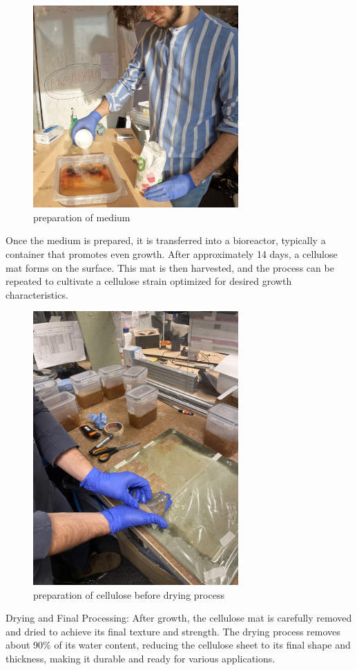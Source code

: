 \begin{figure}[h]
    \centering
    \includegraphics[width=0.7\textwidth]{images/preparation.png}
    \caption{preparation of medium}
    \label{fig:manufactureperso2}
\end{figure} 
Once the medium is prepared, it is transferred into a bioreactor, typically a container that promotes even growth. After approximately 14 days, a cellulose mat forms on the surface. This mat is then harvested, and the process can be repeated to cultivate a cellulose strain optimized for desired growth characteristics.

\begin{figure}[h]
    \centering
    \includegraphics[width=0.7\textwidth]{images/IMG_4565.jpg}
    \caption{preparation of cellulose before drying process}
    \label{fig:manufactureperso3c}
\end{figure} 
Drying and Final Processing: After growth, the cellulose mat is carefully removed and dried to achieve its final texture and strength. The drying process removes about 90\% of its water content, reducing the cellulose sheet to its final shape and thickness, making it durable and ready for various applications.



